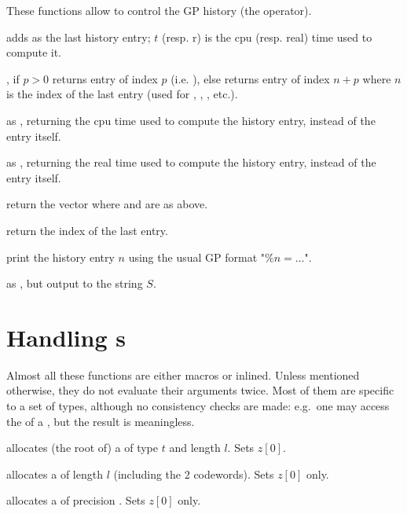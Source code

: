 
These functions allow to control the GP history (the \kbd{\%} operator).

 adds  as the last history
entry; $t$ (resp. r) is the cpu (resp. real) time used to compute it.

, if $p>0$ returns entry of index $p$
(i.e. ), else returns entry of index $n+p$ where $n$ is the
index of the last entry (used for \kbd{\%}, , , etc.).

 as ,
returning the cpu time used to compute the history entry, instead of the entry
itself.

 as ,
returning the real time used to compute the history entry, instead of the entry
itself.

 return the vector  where
 and  are as above.

 return the index of the last entry.

 print the history entry $n$ using the
usual GP format "$\%n = \dots$".

 as ,
but output to the string $S$.

\section{Handling s}
\noindent Almost all these functions are either macros or inlined. Unless
mentioned otherwise, they do not evaluate their arguments twice. Most of them
are specific to a set of types, although no consistency checks are made:
e.g.~one may access the  of a , but the result is
meaningless.


 allocates (the root of) a 
of type $t$ and length $l$. Sets $z[0]$.

 allocates a  of length $l$ (including the
2 codewords). Sets $z[0]$ only.

 allocates a  of precision .
Sets $z[0]$ only.

